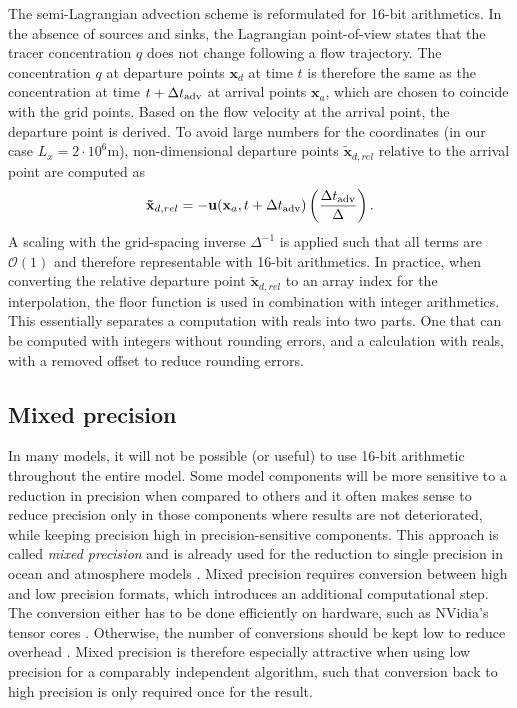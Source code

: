 The semi-Lagrangian advection scheme is reformulated for 16-bit arithmetics. In the absence of sources and sinks,
the Lagrangian point-of-view states that the tracer concentration $q$ does not change following a flow trajectory.
The concentration $q$ at departure points $\mathbf{x}_d$ at time $t$ is therefore the same as the concentration at
time $t+\Delta t_{\operatorname{adv}}$ at arrival points $\mathbf{x}_a$, which are chosen to coincide with the grid points.
Based on the flow velocity at the arrival point, the departure point is derived. To avoid large numbers for the
coordinates (in our case $L_x = 2 \cdot 10^6$m), non-dimensional departure points $\mathbf{\tilde{x}}_{d,rel}$ relative
to the arrival point are computed as
\begin{equation}
\mathbf{\tilde{x}}_{d,rel} = - \mathbf{u}(\mathbf{x}_a,t+\Delta t_{\operatorname{adv}})
\left( \frac{\Delta t_{\operatorname{adv}}}{\Delta} \right).
\label{eq:relcoord}
\end{equation}
A scaling with the grid-spacing inverse $\Delta^{-1}$ is applied such that all terms are $\mathcal{O}(1)$ and therefore
representable with 16-bit arithmetics. In practice, when converting the relative departure point $\mathbf{\tilde{x}}_{d,rel}$
to an array index for the interpolation, the floor function is used in combination with integer arithmetics. This essentially
separates a computation with reals into two parts. One that can be computed with integers without rounding errors,
and a calculation with reals, with a removed offset to reduce rounding errors.

\subsection{Mixed precision}
\label{sec:swm_mixed}

In many models, it will not be possible (or useful) to use 16-bit arithmetic throughout the entire model. Some model components
will be more sensitive to a reduction in precision when compared to others and it often makes sense to reduce precision only in
those components where results are not deteriorated, while keeping precision high in precision-sensitive components. This approach
is called \emph{mixed precision} and is already used for the reduction to single precision in ocean and atmosphere models 
\citep{Vana2017,TintoPrims2019}. Mixed precision requires conversion between high and low precision formats, which introduces
an additional computational step. The conversion either has to be done efficiently on hardware, such as NVidia's tensor cores
\citep{Hatfield2019,Haidar2018}. Otherwise, the number of conversions should be kept low to reduce overhead \citep{Higham2019}.
Mixed precision is therefore especially attractive when using low precision for a comparably independent algorithm, such that
conversion back to high precision is only required once for the result.

